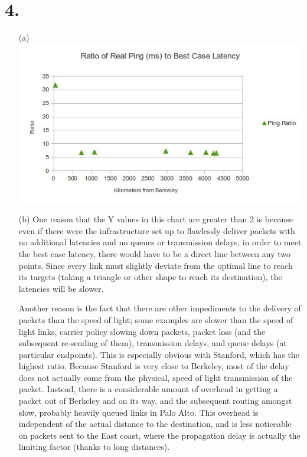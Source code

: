 \documentclass[11pt]{article}
\begin{document}
\section*{4.}
\begin{itemize}
\item[(a)]\includegraphics{RTT_chart}
\item[(b)] One reason that the Y values in this chart are greater than 2 is because even if there were the infrastructure set up to flawlessly deliver packets with no additional latencies and no queues or transmission delays, in order to meet the best case latency, there would have to be a direct line between any two points. Since every link must slightly deviate from the optimal line to reach its targets (taking a triangle or other shape to reach its destination), the latencies will be slower.

Another reason is the fact that there are other impediments to the delivery of packets than the speed of light; some examples are slower than the speed of light links, carrier policy slowing down packets, packet loss (and the subsequent re-sending of them), transmission delays, and queue delays (at particular endpoints). This is especially obvious with Stanford, which has the highest ratio. Because Stanford is very close to Berkeley, most of the delay does not actually come from the physical, speed of light transmission of the packet. Instead, there is a considerable amount of overhead in getting a packet out of Berkeley and on its way, and the subsequent routing amongst slow, probably heavily queued links in Palo Alto. This overhead is independent of the actual distance to the destination, and is less noticeable on packets sent to the East coast, where the propagation delay is actually the limiting factor (thanks to long distances).
\end{itemize}
\end{document}
